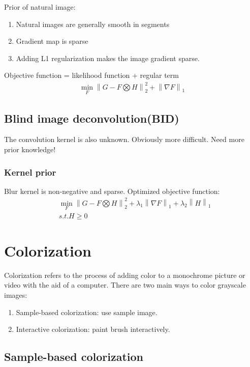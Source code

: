 Prior of natural image: 
\begin{enumerate}
    \item Natural images are generally smooth in segments
    \item Gradient map is sparse
    \item Adding L1 regularization makes the image gradient sparse. 
\end{enumerate}

Objective function = likelihood function + regular term
\begin{align*}
    \min_F\left\| G-F \bigotimes H \right\|_2^2+\left\| \nabla F \right\|_1
\end{align*}

\subsection{Blind image deconvolution(BID)}
The convolution kernel is also unknown. Obviously more difficult. Need more prior knowledge!

\subsubsection{Kernel prior}
Blur kernel is non-negative and sparse. Optimized objective function:
\begin{align*}
    &\min_F\left\| G-F \bigotimes H \right\|_2^2+ \lambda_1 \left\| \nabla F \right\|_1+\lambda_2 \left\| H \right\|_1\\
    &s.t.H\ge 0
\end{align*}

\section{Colorization}
Colorization refers to the process of adding color to a monochrome picture or video with the aid of a computer. There are two main ways to color grayscale images: 
\begin{enumerate}
    \item Sample-based colorization: use sample image. 
    \item Interactive colorization: paint brush interactively. 
\end{enumerate}

\subsection{Sample-based colorization}

